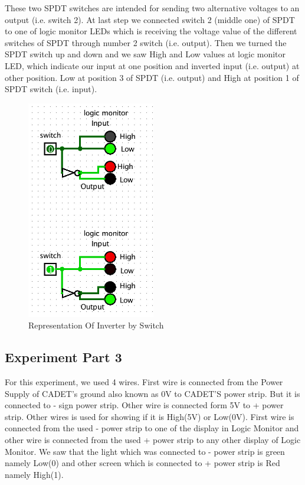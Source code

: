 \documentclass[pdftex,12pt,a4paper]{article}
\begin{document}
These two SPDT switches are intended for sending two alternative voltages to an output (i.e. switch 2). At last step we connected switch 2 (middle one) of SPDT to one of logic monitor LEDs which is receiving the voltage value of the different switches of SPDT through number 2 switch (i.e. output). Then we turned the SPDT switch up and down and we saw High and Low values at logic monitor LED, which indicate our input at one position and inverted input (i.e. output) at other position. Low at position 3 of SPDT (i.e. output) and High at position 1 of SPDT switch (i.e. input).
\begin{figure}[ht]
	\centering
	\includegraphics[width=0.5\textwidth]{switch.png}
	\caption{Representation Of Inverter by Switch}
	\label{fig1}
	
\end{figure}

\subsection{Experiment Part 3}
For this experiment, we used 4 wires. First wire is connected from the Power Supply of CADET’s ground also known as 0V to CADET’S power strip. But it is connected to - sign power strip. Other wire is connected form 5V to + power strip. Other wires is used for showing if it is High(5V) or Low(0V). First wire is connected from the used - power strip to one of the display in Logic Monitor and other wire is connected from  the used + power strip to any other display of Logic Monitor. We saw that the light which was connected to - power strip is green namely Low(0) and other screen which is connected to + power strip is Red namely High(1). 
\end{document}
